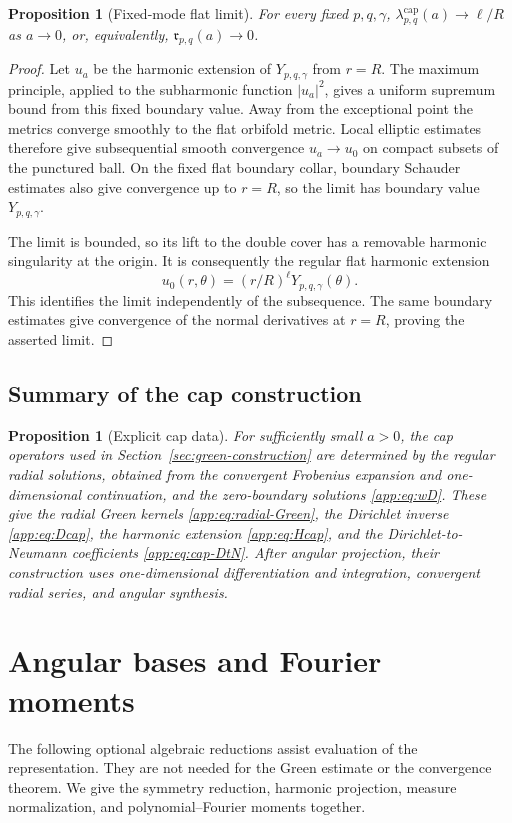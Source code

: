 \documentclass[11pt,a4paper,twoside]{article}
\numberwithin{equation}{section}
\newtheorem{proposition}[theorem]{Proposition}
\theoremstyle{definition}
\theoremstyle{remark}
\begin{document}
\begin{proposition}[Fixed-mode flat limit]
\label{app:prop:flat-limit}
For every fixed \(p,q,\gamma\),
\(\lambda_{p,q}^{\mathrm{cap}}(a)\to\ell/R\) as \(a\to0\), or,
equivalently, \(\mathfrak r_{p,q}(a)\to0\).
\end{proposition}

\begin{proof}
Let \(u_a\) be the harmonic extension of \(Y_{p,q,\gamma}\) from
\(r=R\). The maximum principle, applied to the subharmonic function
\(|u_a|^2\), gives a uniform supremum bound from this fixed boundary
value. Away from the exceptional point the metrics converge smoothly
to the flat orbifold metric. Local elliptic estimates therefore give
subsequential smooth convergence \(u_a\to u_0\) on compact subsets
of the punctured ball. On the fixed flat boundary collar, boundary
Schauder estimates also give convergence up to \(r=R\), so the limit
has boundary value \(Y_{p,q,\gamma}\).

The limit is bounded, so its lift to the double cover has a removable
harmonic singularity at the origin. It is consequently the regular
flat harmonic extension
\[
u_0(r,\theta)=(r/R)^\ell Y_{p,q,\gamma}(\theta).
\]
This identifies the limit independently of the subsequence. The same
boundary estimates give convergence of the normal derivatives at
\(r=R\), proving the asserted limit.
\end{proof}

\subsection{Summary of the cap construction}

\begin{proposition}[Explicit cap data]
\label{app:prop:explicit-cap-data}
For sufficiently small \(a>0\), the cap operators used in
Section~\ref{sec:green-construction} are determined by the regular
radial solutions, obtained from the convergent Frobenius expansion
and one-dimensional continuation, and the zero-boundary solutions
\eqref{app:eq:wD}. These give the radial Green kernels
\eqref{app:eq:radial-Green}, the Dirichlet inverse
\eqref{app:eq:Dcap}, the harmonic extension \eqref{app:eq:Hcap},
and the Dirichlet-to-Neumann coefficients \eqref{app:eq:cap-DtN}.
After angular projection, their construction uses one-dimensional
differentiation and integration, convergent radial series, and angular
synthesis.
\end{proposition}
\section{Angular bases and Fourier moments}
\label{app:angular-evaluation}
The following optional algebraic reductions assist evaluation of
the representation. They are not needed for the Green estimate
or the convergence theorem. We give the symmetry reduction,
harmonic projection, measure normalization, and polynomial--Fourier
moments together.
\end{document}
